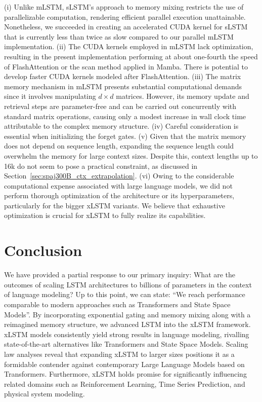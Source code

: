 (i) Unlike mLSTM, sLSTM's approach to memory mixing restricts the use of parallelizable computation, rendering efficient parallel execution unattainable. Nonetheless, we succeeded in creating an accelerated CUDA kernel for sLSTM that is currently less than twice as slow compared to our parallel mLSTM implementation. (ii) The CUDA kernels employed in mLSTM lack optimization, resulting in the present implementation performing at about one-fourth the speed of FlashAttention or the scan method applied in Mamba. There is potential to develop faster CUDA kernels modeled after FlashAttention. (iii) The matrix memory mechanism in mLSTM presents substantial computational demands since it involves manipulating $d \times d$ matrices. However, its memory update and retrieval steps are parameter-free and can be carried out concurrently with standard matrix operations, causing only a modest increase in wall clock time attributable to the complex memory structure. (iv) Careful consideration is essential when initializing the forget gates. (v) Given that the matrix memory does not depend on sequence length, expanding the sequence length could overwhelm the memory for large context sizes. Despite this, context lengths up to 16k do not seem to pose a practical constraint, as discussed in Section~\ref{sec:spaj300B_ctx_extrapolation}. (vi) Owing to the considerable computational expense associated with large language models, we did not perform thorough optimization of the architecture or its hyperparameters, particularly for the bigger xLSTM variants. We believe that exhaustive optimization is crucial for xLSTM to fully realize its capabilities.

\section{Conclusion}
We have provided a partial response to our primary inquiry: What are the outcomes of scaling LSTM architectures to billions of parameters in the context of language modeling? Up to this point, we can state: ``We reach performance comparable to modern approaches such as Transformers and State Space Models''. By incorporating exponential gating and memory mixing along with a reimagined memory structure, we advanced LSTM into the xLSTM framework. xLSTM models consistently yield strong results in language modeling, rivalling state-of-the-art alternatives like Transformers and State Space Models. Scaling law analyses reveal that expanding xLSTM to larger sizes positions it as a formidable contender against contemporary Large Language Models based on Transformers. Furthermore, xLSTM holds promise for significantly influencing related domains such as Reinforcement Learning, Time Series Prediction, and physical system modeling.

